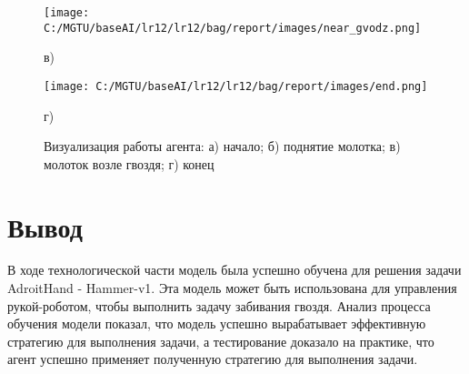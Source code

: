 \begin{figure}[H]
    \centering
    \begin{minipage}[H]{0.48\linewidth}
      \centering
      \texttt{[image: C:/MGTU/baseAI/lr12/lr12/bag/report/images/near\_gvodz.png]}
      \caption*{в)}
    \end{minipage}
    \hfill
    \begin{minipage}[H]{0.48\linewidth}
      \centering
      \texttt{[image: C:/MGTU/baseAI/lr12/lr12/bag/report/images/end.png]}
      \caption*{г)}
    \end{minipage}
    \caption{Визуализация работы агента: а) начало; б) поднятие молотка; в) молоток возле гвоздя; г) конец}
    \label{fig:work}
  \end{figure}

\section*{Вывод}

В ходе технологической части модель была успешно обучена для решения задачи AdroitHand - Hammer-v1. 
Эта модель может быть использована для управления рукой-роботом, чтобы выполнить задачу забивания гвоздя.
Анализ процесса обучения модели показал, что модель успешно вырабатывает эффективную стратегию для выполнения задачи, 
а тестирование доказало на практике, что агент успешно применяет полученную стратегию для выполнения задачи.

\clearpage
